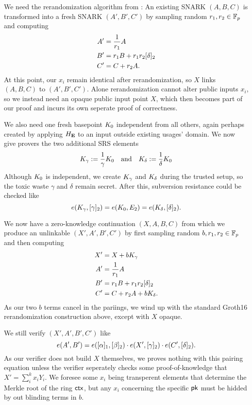 We need the rerandomization algorithm from \cite[Fig.~1]{RandomizationGroth16}:
An existing SNARK $(A,B,C)$ is transformed into a fresh
SNARK $(A',B',C')$ by sampling random $r_1,r_2 \in \mathbb{F}_p$ and computing
$$ \begin{aligned}
A' &= {1 \over r_1} A \\
B' &= r_1 B + r_1 r_2 [\delta]_2 \\
C' &= C + r_2 A . \\
\end{aligned} $$
At this point, our $x_i$ remain identical after rerandomization,
so $X$ links $(A,B,C)$ to $(A',B',C')$.
Alone rerandomization cannot alter public inputs $x_i$, so
we instead need an opaque public input point $X$, which then becomes
part of our proof and incurs its own seperate proof of correctness.

We also need one fresh basepoint $K_0$ independent from all others,
again perhaps created by applying $H_{\mathbf{E}}$ to an input outside existing usages' domain.
We now give provers the two additional SRS elements
$$ K_\gamma := {1\over\gamma} K_0 \quad\textrm{and}\quad
   K_\delta := {1\over\delta} K_0 $$
Although $K_0$ is independent, 
we create $K_\gamma$ and $K_\delta$ during the trusted setup,
 so the toxic waste $\gamma$ and $\delta$ remain secret.
After this, subversion resistance could be checked like 
$$ e(K_\gamma, [\gamma]_2)
   = e(K_0, E_2)
   = e(K_\delta, [\delta]_2) . $$

We now have a zero-knowledge continuation $(X,A,B,C)$ from which
we produce an unlinkable $(X',A',B',C')$ by
 first sampling random $b,r_1,r_2 \in \mathbb{F}_p$ and then computing
$$ \begin{aligned}
X' &= X + b K_\gamma \\
A' &= {1 \over r_1} A \\
B' &= r_1 B + r_1 r_2 [\delta]_2 \\
C' &= C + r_2 A + b K_\delta . \\
\end{aligned} $$
As our two $b$ terms cancel in the pariings, we wind up with the standard Groth16
 rerandomization construction above, except with $X$ opaque.

We still verify $(X',A',B',C')$ like 
$$ e(A',B') = e([\alpha]_1, [\beta]_2) \cdot
 e(X', [\gamma]_2) \cdot e(C', [\delta]_2) . $$
As our verifier does not build $X$ themselves, we proves nothing
with this pairing equation unless the verifier seperately checks
 some proof-of-knowledge that $X' = \sum_i^k x_i Y_i$.
We foresee some $x_i$ being transperent elements that determine the
Merkle root of the ring $\mathsf{ctx}$, but any $x_i$ concerning the
 specific $\mathsf{pk}$ must be hidded by out blinding terms in $b$.

